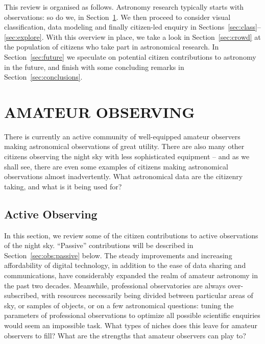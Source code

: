 \documentclass{ar2e}
\def\Sref#1{Section~\ref{#1}\xspace}
\begin{document}
This review is organised as follows. Astronomy research typically starts with
observations: so do we, in \Sref{sec:obs}. We then proceed to consider visual
classification, data modeling and finally citizen-led enquiry in 
Sections~\ref{sec:class}--\ref{sec:explore}. With this overview in place, we
take a look in \Sref{sec:crowd} at the population of citizens who take part in
astronomical research. 
In \Sref{sec:future} we speculate on potential citizen contributions to
astronomy in the future, and finish with some
concluding remarks in \Sref{sec:conclusions}.



\section{AMATEUR OBSERVING}
\label{sec:obs}

There is currently an active community of well-equipped amateur observers making
astronomical observations of great utility. There are also many other citizens
observing the night sky with less sophisticated equipment -- and as we shall
see, there are even some examples of citizens making astronomical observations
almost inadvertently. What astronomical data are the citizenry taking, and what
is it being used for?



\subsection{Active Observing}
\label{sec:obs:active}

In this section, we review some of the citizen contributions to active
observations of the night sky.  ``Passive'' contributions  will be described in
\Sref{sec:obs:passive} below. The steady improvements and increasing
affordability of digital technology, in addition to the ease of data sharing and
communications, have considerably expanded the realm of amateur astronomy in the
past two decades.  Meanwhile, professional observatories are always
over-subscribed, with resources necessarily being divided between particular
areas of sky, or samples of objects, or on a few astronomical questions: tuning
the parameters of professional observations to optimize all possible scientific
enquiries would seem an impossible task. What types of  niches does this leave
for amateur observers to fill? What are the strengths that amateur observers can
play to?
\end{document}
